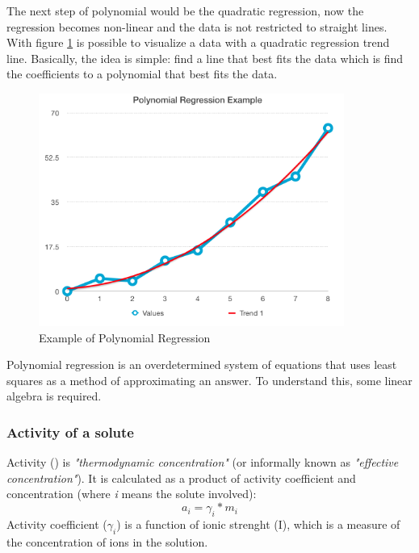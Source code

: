 \documentclass[ppgc,mestrado,english]{iiufrgs}
\begin{document}
The next step of polynomial would be the quadratic regression, now the regression becomes non-linear and the data is not restricted to straight lines. With figure \ref{fig:degree2} is possible to visualize a data with a quadratic regression trend line. Basically, the idea is simple: find a line that best fits 
the data which is find the coefficients to a polynomial that best fits the data.

\begin{figure}[ht!]
\centering
\includegraphics[width=100mm]{degree2.png}
\caption{Example of Polynomial Regression}
\label{fig:degree2}
\end{figure}

Polynomial regression is an overdetermined system of equations that uses least squares as a method of approximating an answer. To understand this, some linear algebra is required. 


\subsubsection{Activity of a solute}
Activity () is \emph{"thermodynamic concentration"} (or informally known as \emph{"effective concentration"}). It is calculated as a product of activity coefficient and concentration (where \emph{i} means the solute involved):
\begin{equation}\label{activityEq}
a_i = \gamma_i * m_i
\end{equation}
Activity coefficient ($\gamma_i$) is a function of ionic strenght (I), which is a measure of the concentration of ions in the solution.  

\end{document}

